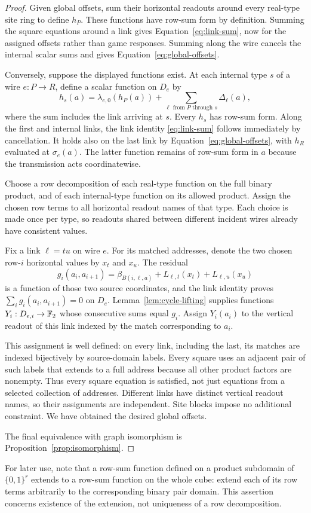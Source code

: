 \begin{proof}
Given global offsets, sum their horizontal readouts around every
real-type site ring to define $h_P$. These functions have row-sum
form by definition. Summing the square equations around a link
gives Equation~\eqref{eq:link-sum}, now for the assigned offsets
rather than game responses. Summing along the wire cancels the
internal scalar sums and gives
Equation~\eqref{eq:global-offsets}.

Conversely, suppose the displayed functions exist. At each internal
type $s$ of a wire $e:P\to R$, define a scalar function on $D_e$ by
\begin{equation}
 h_s(a)=\lambda_{e,0}(h_P(a))
       +\sum_{\ell\text{ from }P\text{ through }s}\Delta_\ell(a),
 \label{eq:internal-offset}
\end{equation}
where the sum includes the link arriving at $s$. Every $h_s$ has
row-sum form. Along the first and internal links, the link identity
\eqref{eq:link-sum} follows immediately by cancellation. It holds
also on the last link by Equation~\eqref{eq:global-offsets}, with
$h_R$ evaluated at $\sigma_e(a)$. The latter function remains of
row-sum form in $a$ because the transmission acts coordinatewise.

Choose a row decomposition of each real-type function on the full
binary product, and of each internal-type function on its allowed
product. Assign the chosen row terms to all horizontal readout
names of that type. Each choice is made once per type, so readouts
shared between different incident wires already have consistent
values.

Fix a link $\ell=tu$ on wire $e$. For its matched addresses, denote
the two chosen row-$i$ horizontal values by $x_t$ and $x_u$.
The residual
\[
 g_i(a_i,a_{i+1})=
 \beta_{B(i,\ell,a)}+L_{\ell,t}(x_t)+L_{\ell,u}(x_u)
\]
is a function of those two source coordinates, and the link
identity proves $\sum_i g_i(a_i,a_{i+1})=0$ on $D_e$.
Lemma~\ref{lem:cycle-lifting} supplies functions
$Y_i:D_{e,i}\to\mathbb F_2$ whose consecutive sums equal $g_i$.
Assign $Y_i(a_i)$ to the vertical readout of this link indexed by
the match corresponding to $a_i$.

This assignment is well defined: on every link, including the
last, its matches are indexed bijectively by source-domain labels.
Every square uses an adjacent pair of such labels that extends
to a full address because all other product factors are nonempty.
Thus every square equation is satisfied, not just equations from
a selected collection of addresses. Different links have distinct
vertical readout names, so their assignments are independent.
Site blocks impose no additional constraint. We have obtained
the desired global offsets.

The final equivalence with graph isomorphism is
Proposition~\ref{prop:isomorphism}.
\end{proof}

For later use, note that a row-sum function defined on a product
subdomain of $\{0,1\}^r$ extends to a row-sum function on the whole
cube: extend each of its row terms arbitrarily to the corresponding
binary pair domain. This assertion concerns existence of the
extension, not uniqueness of a row decomposition.
